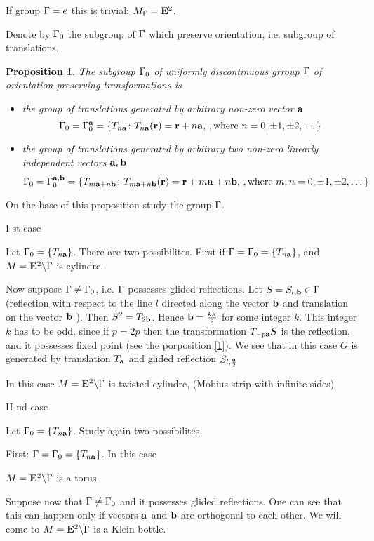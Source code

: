 \documentclass[12pt]{article}
\newtheorem{proposition}{Proposition}
\theoremstyle{definition}
\numberwithin{equation}{section}
\begin{document}
  If group ${\Gamma}=e$ this is trivial: $M_{\Gamma}={\bf E}^2$.

Denote by ${\Gamma}_0$ the subgroup of ${\Gamma}$
which preserve orientation, i.e. subgroup of translations.


\begin{proposition}\label{3}
The subgroup ${\Gamma}_0$ of uniformly discontinuous
grroup ${\Gamma}$
of orientation preserving transformations
is 

\begin{itemize}
\item the group of translations generated
  by arbitrary non-zero vector ${\bf a}$
        $$
 {\Gamma}_0={\Gamma}_0^{{\bf a}}=\{T_{n{\bf a}}\colon T_{n{\bf a}}({\bf r})={\bf r}+n{\bf a},\,,
{\rm where}\,\, n=0,\pm 1,\pm 2,\dots\}
        $$
\item the group of translations generated
  by arbitrary two non-zero linearly independent 
vectors ${\bf a},{\bf b}$
        $$
 {\Gamma}_0={\Gamma}_0^{{\bf a},{\bf b}}=
\{T_{m{\bf a}+n{\bf b}}\colon T_{m{\bf a}+n{\bf b}}({\bf r})=
{\bf r}+m{\bf a}+n{\bf b},\,,
{\rm where}\,\, m,n=0,\pm 1,\pm 2,\dots\}
        $$
\end{itemize}


\end{proposition}

On the base of this proposition study the group ${\Gamma}$.

\m
I-st case


Let   ${\Gamma}_0=\{T_{n{\bf a}}\}$. There are two possibilites.
First if ${\Gamma}={\Gamma}_0=\{T_{n{\bf a}}\}$,
and $M={\bf E}^2\backslash {\Gamma}$ is cylindre.

Now suppose  ${\Gamma}\not={\Gamma}_0$,
i.e. ${\Gamma}$ possesses glided reflections.
Let $S=S_{l,{\bf b}}\in {\Gamma}$
(reflection with respect to the line 
$l$ directed along the vector
${\bf b}$ and translation
on the vector ${\bf b}$ ). Then
$S^2=T_{2{\bf b}}$. Hence ${\bf b}={k{\bf a}\over 2}$
for some integer $k$. This integer $k$ has to be odd,
since if $p=2p$ then the transformation $T_{-p{\bf a}}S$
is the reflection, and it possesses fixed point
(see the porposition \ref{1}). 
We see that in this case $G$ is generated by translation
$T_{\bf a}$ and glided reflection  $S_{l,{{\bf a}\over 2}}$

In this case
$M={\bf E}^2\backslash {\Gamma}$ is twisted cylindre, 
(Mobius strip
with infinite sides)
\m

II-nd case


Let   ${\Gamma}_0=\{T_{n{\bf a}}\}$. Study again 
 two possibilites.

First:
${\Gamma}={\Gamma}_0=\{T_{n{\bf a}}\}$. In this case

$M={\bf E}^2\backslash {\Gamma}$ is a torus.


Suppose now that ${\Gamma}\not={\Gamma}_0$ and it possesses glided
reflections. One can see that this can happen
only if vectors ${\bf a}$ and ${\bf b}$ are orthogonal to each
other. We will come to
$M={\bf E}^2\backslash {\Gamma}$ is a Klein bottle.
\end{document}
